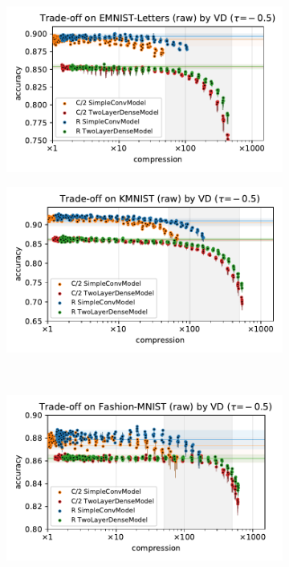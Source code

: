 \documentclass[a4paper,10pt,twocolumn]{article}
\begin{document}
\begin{figure}[b]
  \centering
  \begin{subfigure}[b]{0.5\columnwidth}
    \centering
    \includegraphics[width=\linewidth]{figure__mnist-like__trade-off/appendix__cmp__VD__emnist_letters__raw__-0.5.pdf}
  \end{subfigure}%
  \begin{subfigure}[b]{0.5\columnwidth}
    \centering
    \includegraphics[width=\linewidth]{figure__mnist-like__trade-off/appendix__cmp__VD__kmnist__raw__-0.5.pdf}
  \end{subfigure} \\%
  \begin{subfigure}[b]{0.5\columnwidth}
    \centering
    \includegraphics[width=\linewidth]{figure__mnist-like__trade-off/appendix__cmp__VD__fashionmnist__raw__-0.5.pdf}

\end{subfigure}
\end{figure}
\end{document}
